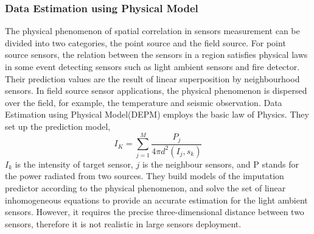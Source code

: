 \subsubsection{Data Estimation using Physical Model}
The physical phenomenon of spatial correlation in sensors measurement can be divided into two categories, the point source and the field source\cite{viran:spatialtemporal}. For point source sensors, the relation between the sensors in a region satisfies physical laws in some event detecting sensors such as light ambient sensors and fire detector. 
Their prediction values are the result of linear superposition by neighbourhood sensors. 
In field source sensor applications, the physical phenomenon is dispersed over the field, for example, the temperature and seismic observation. 
Data Estimation using Physical Model(DEPM)\cite{li2008data} employs the basic law of Physics.
They set up the prediction model,  
\begin{equation}
I_K =\sum_{j=1}^M\frac{P_j}{4\pi d^2(I_j,s_k)}
\label{DEPM}
\end{equation} 
$I_k$ is the intensity of target sensor, $j$ is the neighbour sensors, and P stands for the power radiated from two sources. 
They build models of the imputation predictor according to the physical phenomenon, and solve the set of linear inhomogeneous equations to provide an accurate estimation for the light ambient sensors. However, it requires the precise  three-dimensional distance between two sensors, therefore it is not realistic in large sensors deployment.

